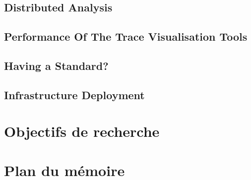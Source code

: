 \subsection{Distributed Analysis}

\subsection{Performance Of The Trace Visualisation Tools}

\subsection{Having a Standard?}

\subsection{Infrastructure Deployment}




\section{Objectifs de recherche}  %


\section{Plan du mémoire}  %
